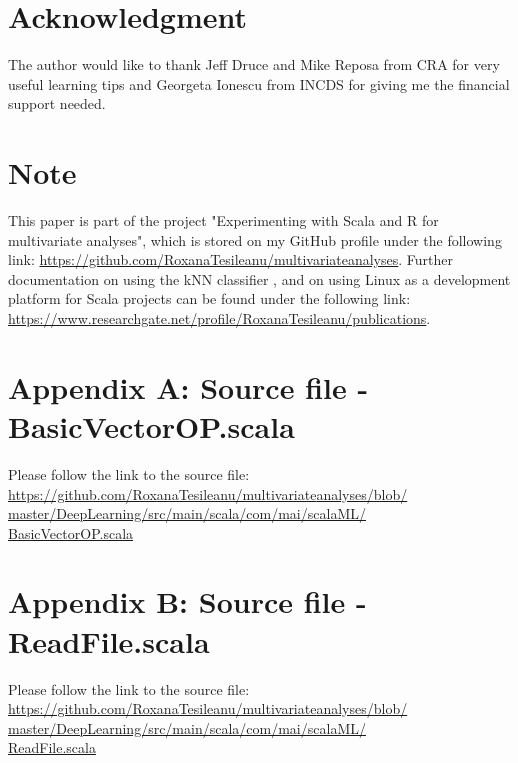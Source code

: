 \documentclass[twoside, 11 p]{article}
\begin{document}
\section*{Acknowledgment}
The author would like to thank Jeff Druce and Mike Reposa from CRA for very useful learning tips and Georgeta Ionescu from INCDS for giving me the financial support needed. 

\section*{Note}
This paper is part of the project "Experimenting with Scala and R for multivariate analyses", which  is stored on my GitHub profile under the following link: \href{https://github.com/RoxanaTesileanu/multivariate_analyses}{https://github.com/RoxanaTesileanu/multivariate\underline{\space}analyses}. Further documentation on using the kNN classifier \cite{tesileanu_introduction_2017}, and on using Linux as a development platform for Scala projects \cite{tesileanu_using_2017} can be found under the following link: \href{https://www.researchgate.net/profile/Roxana_Tesileanu/publications}{https://www.researchgate.net/profile/Roxana\underline{\space}Tesileanu/publications}.  

\appendix

\section*{Appendix A: Source file - BasicVectorOP.scala}

Please follow the link to the source file:\\
\href{https://github.com/RoxanaTesileanu/multivariate_analyses/blob/master/DeepLearning/src/main/scala/com/mai/scalaML/BasicVectorOP.scala}{https://github.com/RoxanaTesileanu/multivariate\underline{\space}analyses/blob/\\master/DeepLearning/src/main/scala/com/mai/scalaML/\\BasicVectorOP.scala}

\section*{Appendix B: Source file - ReadFile.scala}

Please follow the link to the source file:\\
\href{https://github.com/RoxanaTesileanu/multivariate_analyses/blob/master/DeepLearning/src/main/scala/com/mai/scalaML/ReadFile.scala}{https://github.com/RoxanaTesileanu/multivariate\underline{\space}analyses/blob/\\master/DeepLearning/src/main/scala/com/mai/scalaML/\\ReadFile.scala} 
\end{document}
